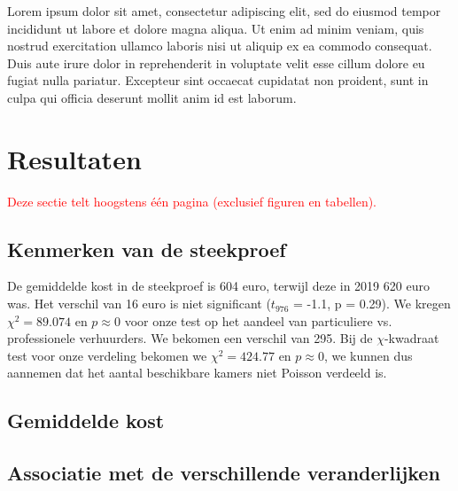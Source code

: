 \documentclass[a4paper]{kulakarticle}
\newcommand{\rood}[1]{\textcolor{red}{#1}}
\begin{document}
	Lorem ipsum dolor sit amet, consectetur adipiscing elit, sed do eiusmod tempor incididunt ut labore et dolore magna aliqua. Ut enim ad minim veniam, quis nostrud exercitation ullamco laboris nisi ut aliquip ex ea commodo consequat. Duis aute irure dolor in reprehenderit in voluptate velit esse cillum dolore eu fugiat nulla pariatur. Excepteur sint occaecat cupidatat non proident, sunt in culpa qui officia deserunt mollit anim id est laborum.
	
	\section{Resultaten}
	\rood{Deze sectie telt hoogstens één pagina (exclusief figuren en tabellen).}
	\subsection{Kenmerken van de steekproef}
De gemiddelde kost in de steekproef is 604 euro, terwijl deze in 2019 620 euro was. Het verschil van 16 euro is niet significant ($t_{976}$ = -1.1, p = 0.29). We kregen $\chi^2 = 89.074$ en $p \approx 0$ voor onze test op het aandeel van particuliere vs. professionele verhuurders. We bekomen een verschil van 295. Bij de $\chi$-kwadraat test voor onze verdeling bekomen we $\chi^2 = 424.77$ en $p \approx 0$, we kunnen dus aannemen dat het aantal beschikbare kamers niet Poisson verdeeld is.
	\subsection{Gemiddelde kost}
	
	
	
	\subsection{Associatie met de verschillende veranderlijken}
	
\end{document}
